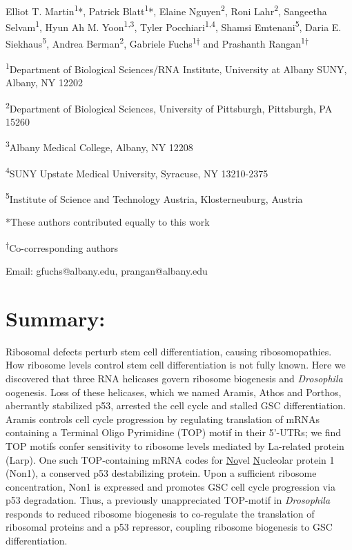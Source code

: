 \documentclass[12pt,oneside]{reedthesis}
\begin{document}
Elliot T. Martin\textsuperscript{1}*, Patrick Blatt\textsuperscript{1}*, Elaine Nguyen\textsuperscript{2}, Roni Lahr\textsuperscript{2}, Sangeetha Selvam\textsuperscript{1}, Hyun Ah M. Yoon\textsuperscript{1,3}, Tyler Pocchiari\textsuperscript{1,4}, Shamsi Emtenani\textsuperscript{5}, Daria E. Siekhaus\textsuperscript{5}, Andrea Berman\textsuperscript{2}, Gabriele Fuchs\textsuperscript{1†} and Prashanth Rangan\textsuperscript{1†}

\textsuperscript{1}Department of Biological Sciences/RNA Institute, University at Albany SUNY, Albany, NY 12202

\textsuperscript{2}Department of Biological Sciences, University of Pittsburgh, Pittsburgh, PA 15260

\textsuperscript{3}Albany Medical College, Albany, NY 12208

\textsuperscript{4}SUNY Upstate Medical University, Syracuse, NY 13210-2375

\textsuperscript{5}Institute of Science and Technology Austria, Klosterneuburg, Austria

*These authors contributed equally to this work

\textsuperscript{†}Co-corresponding authors

Email: gfuchs@albany.edu, prangan@albany.edu


\hypertarget{summary-1}{%
\section{Summary:}\label{summary-1}}

Ribosomal defects perturb stem cell differentiation, causing ribosomopathies. How ribosome levels control stem cell differentiation is not fully known. Here we discovered that three RNA helicases govern ribosome biogenesis and \emph{Drosophila} oogenesis. Loss of these helicases, which we named Aramis, Athos and Porthos, aberrantly stabilized p53, arrested the cell cycle and stalled GSC differentiation. Aramis controls cell cycle progression by regulating translation of mRNAs containing a Terminal Oligo Pyrimidine (TOP) motif in their 5'-UTRs; we find TOP motifs confer sensitivity to ribosome levels mediated by La-related protein (Larp). One such TOP-containing mRNA codes for \underline{No}vel \underline{N}ucleolar protein 1 (Non1), a conserved p53 destabilizing protein. Upon a sufficient ribosome concentration, Non1 is expressed and promotes GSC cell cycle progression via p53 degradation. Thus, a previously unappreciated TOP-motif in \emph{Drosophila} responds to reduced ribosome biogenesis to co-regulate the translation of ribosomal proteins and a p53 repressor, coupling ribosome biogenesis to GSC differentiation.
\end{document}
